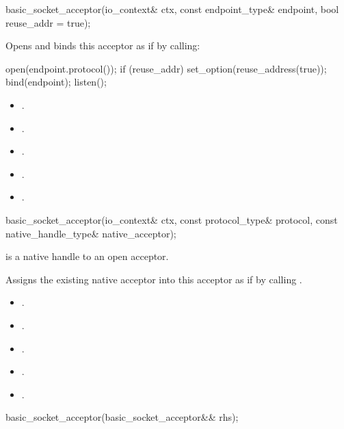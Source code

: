 \begin{itemdecl}
basic_socket_acceptor(io_context& ctx, const endpoint_type& endpoint,
                      bool reuse_addr = true);
\end{itemdecl}

\begin{itemdescr}
\pnum
\effects Opens and binds this acceptor as if by calling: 
\begin{codeblock}
open(endpoint.protocol());
if (reuse_addr)
  set_option(reuse_address(true));
bind(endpoint);
listen();
\end{codeblock}


\pnum
\postconditions 
\begin{itemize}
\item
{}.
\item
{}.
\item
{}.
\item
{}.
\item
{}.
\end{itemize}
\end{itemdescr}

\begin{itemdecl}
basic_socket_acceptor(io_context& ctx, const protocol_type& protocol,
                      const native_handle_type& native_acceptor);
\end{itemdecl}

\begin{itemdescr}
\pnum
\requires {} is a native handle to an open acceptor.

\pnum
\effects Assigns the existing native acceptor into this acceptor as if by calling .

\pnum
\postconditions 
\begin{itemize}
\item
{}.
\item
{}.
\item
{}.
\item
{}.
\item
{}.
\end{itemize}
\end{itemdescr}

\begin{itemdecl}
basic_socket_acceptor(basic_socket_acceptor&& rhs);
\end{itemdecl}

